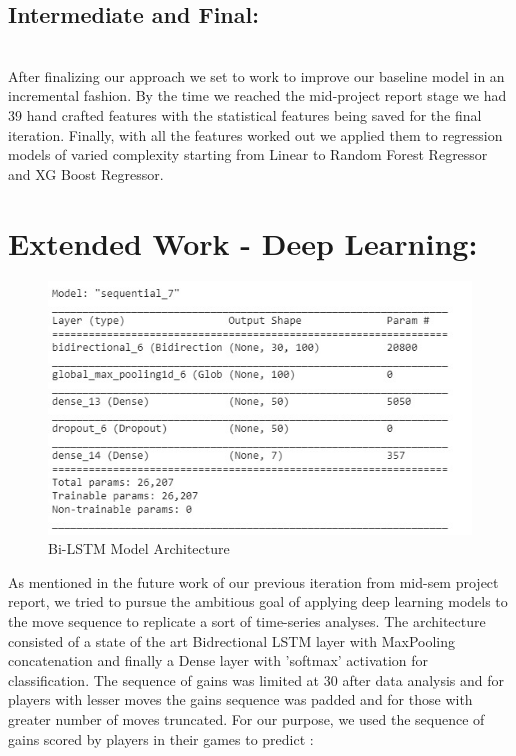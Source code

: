 \documentclass[11pt,a4paper]{article}
\begin{document}
\subsection{Intermediate and Final:}\\
After finalizing our approach we set to work to improve our baseline model in an incremental fashion. By the time we reached the mid-project report stage we had 39 hand crafted features with the statistical features being saved for the final iteration. Finally, with all the features worked out we applied them to regression models of varied complexity starting from Linear to Random Forest Regressor and XG Boost Regressor. 

\section{Extended Work - Deep Learning:}
\begin{figure}[!ht]
    \centering
    \includegraphics[scale=0.45]{LSTM_Architecture.jpeg}
    \caption{Bi-LSTM Model Architecture }
    \label{fig:LSTM}
\end{figure}
As mentioned in the future work of our previous iteration from mid-sem project report, we tried to pursue the ambitious goal of applying deep learning models to the move sequence to replicate a sort of time-series analyses. The architecture consisted of a state of the art Bidrectional LSTM layer with  MaxPooling concatenation and finally a Dense layer with 'softmax' activation for classification. The sequence of gains was limited at 30 after data analysis and for players with lesser moves the gains sequence was padded and for those with greater number of moves truncated. For our purpose, we used the sequence of gains scored by players in their games to predict :
\end{document}
